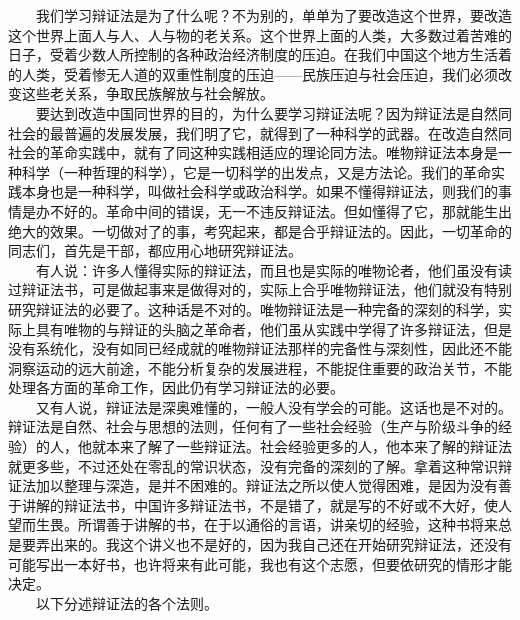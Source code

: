 \documentclass[cn,11pt,chinese]{elegantbook}
\begin{document}
　　我们学习辩证法是为了什么呢？不为别的，单单为了要改造这个世界，要改造这个世界上面人与人、人与物的老关系。这个世界上面的人类，大多数过着苦难的日子，受着少数人所控制的各种政治经济制度的压迫。在我们中国这个地方生活着的人类，受着惨无人道的双重性制度的压迫——民族压迫与社会压迫，我们必须改变这些老关系，争取民族解放与社会解放。\\
　　要达到改造中国同世界的目的，为什么要学习辩证法呢？因为辩证法是自然同社会的最普遍的发展发展，我们明了它，就得到了一种科学的武器。在改造自然同社会的革命实践中，就有了同这种实践相适应的理论同方法。唯物辩证法本身是一种科学（一种哲理的科学），它是一切科学的出发点，又是方法论。我们的革命实践本身也是一种科学，叫做社会科学或政治科学。如果不懂得辩证法，则我们的事情是办不好的。革命中间的错误，无一不违反辩证法。但如懂得了它，那就能生出绝大的效果。一切做对了的事，考究起来，都是合乎辩证法的。因此，一切革命的同志们，首先是干部，都应用心地研究辩证法。\\
　　有人说：许多人懂得实际的辩证法，而且也是实际的唯物论者，他们虽没有读过辩证法书，可是做起事来是做得对的，实际上合乎唯物辩证法，他们就没有特别研究辩证法的必要了。这种话是不对的。唯物辩证法是一种完备的深刻的科学，实际上具有唯物的与辩证的头脑之革命者，他们虽从实践中学得了许多辩证法，但是没有系统化，没有如同已经成就的唯物辩证法那样的完备性与深刻性，因此还不能洞察运动的远大前途，不能分析复杂的发展进程，不能捉住重要的政治关节，不能处理各方面的革命工作，因此仍有学习辩证法的必要。\\
　　又有人说，辩证法是深奥难懂的，一般人没有学会的可能。这话也是不对的。辩证法是自然、社会与思想的法则，任何有了一些社会经验（生产与阶级斗争的经验）的人，他就本来了解了一些辩证法。社会经验更多的人，他本来了解的辩证法就更多些，不过还处在零乱的常识状态，没有完备的深刻的了解。拿着这种常识辩证法加以整理与深造，是并不困难的。辩证法之所以使人觉得困难，是因为没有善于讲解的辩证法书，中国许多辩证法书，不是错了，就是写的不好或不大好，使人望而生畏。所谓善于讲解的书，在于以通俗的言语，讲亲切的经验，这种书将来总是要弄出来的。我这个讲义也不是好的，因为我自己还在开始研究辩证法，还没有可能写出一本好书，也许将来有此可能，我也有这个志愿，但要依研究的情形才能决定。\\
　　以下分述辩证法的各个法则。\\
\end{document}
